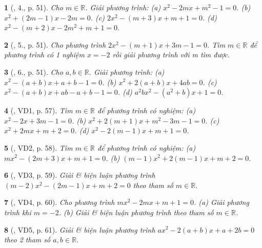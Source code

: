 \documentclass{article}
\newtheorem{baitoan}{}
\begin{document}
\begin{baitoan}[\cite{Thu_Viet_Minh_ptb2}, 4., p. 51]
	Cho $m\in\mathbb{R}$. Giải phương trình: (a) $x^2 - 2mx + m^2 - 1 = 0$. (b) $x^2 + (2m - 1)x - 2m = 0$. (c) $2x^2 - (m + 3)x + m + 1 = 0$. (d) $x^2 - (m + 2)x - 2m^2 + m + 1 = 0$.
\end{baitoan}

\begin{baitoan}[\cite{Thu_Viet_Minh_ptb2}, 5., p. 51]
	Cho phương trình $2x^2 - (m + 1)x + 3m - 1 = 0$. Tìm $m\in\mathbb{R}$ để phương trình có 1 nghiệm $x = -2$ rồi giải phương trình với m tìm được.
\end{baitoan}

\begin{baitoan}[\cite{Thu_Viet_Minh_ptb2}, 6., p. 51]
	Cho $a,b\in\mathbb{R}$. Giải phương trình: (a) $x^2 - (a + b)x + a + b - 1 = 0$. (b) $x^2 + 2(a + b)x + 4ab = 0$. (c) $x^2 - (a + b)x + ab - a + b - 1 = 0$. (d) $a^2bx^2 - (a^2 + b)x + 1 = 0$.
\end{baitoan}

\begin{baitoan}[\cite{Thu_Viet_Minh_ptb2}, VD1, p. 57]
	Tìm $m\in\mathbb{R}$ để phương trình có nghiệm: (a) $x^2 - 2x + 3m - 1 = 0$. (b) $x^2 + 2(m + 1)x + m^2 - 3m - 1 = 0$. (c) $x^2 + 2mx + m + 2 = 0$. (d) $x^2 - 2(m - 1)x + m + 1 = 0$.
\end{baitoan}

\begin{baitoan}[\cite{Thu_Viet_Minh_ptb2}, VD2, p. 58]
	Tìm $m\in\mathbb{R}$ để phương trình có nghiệm: (a) $mx^2 - (2m + 3)x + m + 1 = 0$. (b) $(m - 1)x^2 + 2(m - 1)x + m + 2 = 0$.
\end{baitoan}

\begin{baitoan}[\cite{Thu_Viet_Minh_ptb2}, VD3, p. 59]
	Giải \& biện luận phương trình $(m - 2)x^2 - (2m - 1)x + m + 2 = 0$ theo tham số $m\in\mathbb{R}$.
\end{baitoan}

\begin{baitoan}[\cite{Thu_Viet_Minh_ptb2}, VD4, p. 60]
	Cho phương trình $mx^2 - 2mx + m + 1 = 0$. (a) Giải phương trình khi $m = -2$. (b) Giải \& biện luận phương trình theo tham số $m\in\mathbb{R}$.
\end{baitoan}

\begin{baitoan}[\cite{Thu_Viet_Minh_ptb2}, VD5, p. 61]
	Giải \& biện luận phương trình $ax^2 - 2(a + b)x + a + 2b = 0$ theo 2 tham số $a,b\in\mathbb{R}$.
\end{baitoan}
\end{document}
